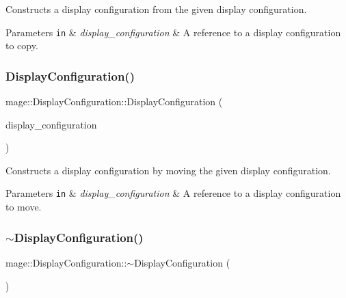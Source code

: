 Constructs a display configuration from the given display configuration.


\begin{DoxyParams}[1]{Parameters}
\mbox{\tt in}  & {\em display\+\_\+configuration} & A reference to a display configuration to copy. \\
\hline
\end{DoxyParams}
\hypertarget{structmage_1_1_display_configuration_a5adbfbaf7de92292af56b2b56f76d548}{}\label{structmage_1_1_display_configuration_a5adbfbaf7de92292af56b2b56f76d548} 
\subsubsection{\texorpdfstring{Display\+Configuration()}{DisplayConfiguration()}\hspace{0.1cm}{\footnotesize\ttfamily [3/3]}}
{\footnotesize\ttfamily mage\+::\+Display\+Configuration\+::\+Display\+Configuration (\begin{DoxyParamCaption}\item[{\hyperlink{structmage_1_1_display_configuration}{Display\+Configuration} \&\&}]{display\+\_\+configuration }\end{DoxyParamCaption})\hspace{0.3cm}{\ttfamily [default]}}

Constructs a display configuration by moving the given display configuration.


\begin{DoxyParams}[1]{Parameters}
\mbox{\tt in}  & {\em display\+\_\+configuration} & A reference to a display configuration to move. \\
\hline
\end{DoxyParams}
\hypertarget{structmage_1_1_display_configuration_a91cdf4f2015177e41290238d96a55328}{}\label{structmage_1_1_display_configuration_a91cdf4f2015177e41290238d96a55328} 
\subsubsection{\texorpdfstring{$\sim$\+Display\+Configuration()}{~DisplayConfiguration()}}
{\footnotesize\ttfamily mage\+::\+Display\+Configuration\+::$\sim$\+Display\+Configuration (\begin{DoxyParamCaption}{ }\end{DoxyParamCaption})\hspace{0.3cm}{\ttfamily [default]}}

